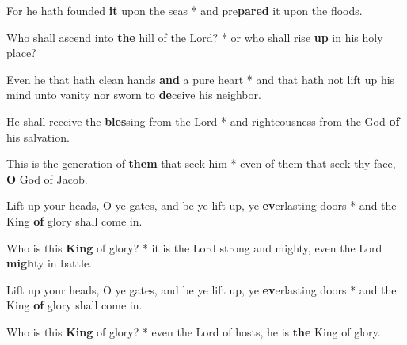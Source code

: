 \begin{multicols}{2}
	For he hath founded \textbf{it} upon the seas * and pre\textbf{pared} it upon the floods.
	
	Who shall ascend into \textbf{the} hill of the Lord? * or who shall rise \textbf{up} in his holy place?
	
	Even he that hath clean hands \textbf{and} a pure heart * and that hath not lift up his mind unto vanity nor sworn to \textbf{de}ceive his neighbor.
	
	He shall receive the \textbf{bles}sing from the Lord * and righteousness from the God \textbf{of} his salvation.
	
	This is the generation of \textbf{them} that seek him * even of them that seek thy face, \textbf{O} God of Jacob.
	
	Lift up your heads, O ye gates, and be ye lift up, ye \textbf{ev}erlasting doors * and the King \textbf{of} glory shall come in.
	
	Who is this \textbf{King} of glory? * it is the Lord strong and mighty, even the Lord \textbf{migh}ty in battle.
	
	Lift up your heads, O ye gates, and be ye lift up, ye \textbf{ev}erlasting doors * and the King \textbf{of} glory shall come in.
	
	Who is this \textbf{King} of glory? * even the Lord of hosts, he is \textbf{the} King of glory.
\end{multicols}